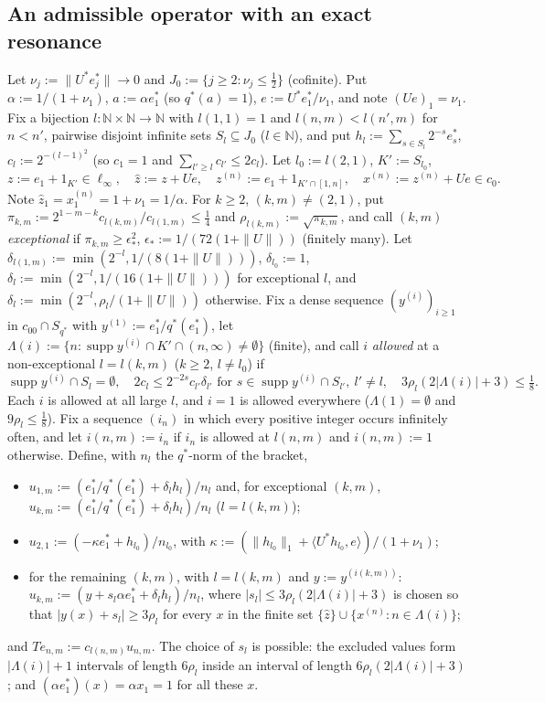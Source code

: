 \documentclass[10pt]{amsart}
\theoremstyle{definition}
\theoremstyle{remark}
\newcommand{\supp}{\operatorname{supp}}
\newcommand{\N}{\mathbb N}
\newcommand{\zh}{\hat z}
\newcommand{\ip}[2]{\langle #1,#2\rangle}
\begin{document}
\subsection{An admissible operator with an exact resonance}
Let $\nu_j:=\|U^*e_j^*\|\to0$ and $J_0:=\{j\ge2:\nu_j\le\frac12\}$
(cofinite).  Put $\alpha:=1/(1+\nu_1)$, $a:=\alpha e_1^*$ (so $q^*(a)=1$),
$e:=U^*e_1^*/\nu_1$, and note $(Ue)_1=\nu_1$.  Fix a bijection
$l:\N\times\N\to\N$ with $l(1,1)=1$ and $l(n,m)<l(n',m)$ for $n<n'$, pairwise
disjoint infinite sets $S_l\subseteq J_0$ ($l\in\N$), and put
$h_l:=\sum_{s\in S_l}2^{-s}e_s^*$, $c_l:=2^{-(l-1)^2}$ (so $c_1=1$ and
$\sum_{l'\ge l}c_{l'}\le2c_l$).  Let $l_0:=l(2,1)$, $K':=S_{l_0}$,
\[
 z:=e_1+1_{K'}\in\ell_\infty,\quad \zh:=z+Ue,\quad
 z^{(n)}:=e_1+1_{K'\cap[1,n]},\quad x^{(n)}:=z^{(n)}+Ue\in c_0 .
\]
Note $\zh_1=x^{(n)}_1=1+\nu_1=1/\alpha$.  For $k\ge2$, $(k,m)\ne(2,1)$, put
$\pi_{k,m}:=2^{1-m-k}c_{l(k,m)}/c_{l(1,m)}\le\frac14$ and
$\rho_{l(k,m)}:=\sqrt{\pi_{k,m}}$, and call $(k,m)$ \emph{exceptional} if
$\pi_{k,m}\ge\epsilon_*^2$, $\epsilon_*:=1/(72(1+\|U\|))$ (finitely many).
Let $\delta_{l(1,m)}:=\min(2^{-l},1/(8(1+\|U\|)))$, $\delta_{l_0}:=1$,
$\delta_l:=\min(2^{-l},1/(16(1+\|U\|)))$ for exceptional $l$, and
$\delta_l:=\min(2^{-l},\rho_l/(1+\|U\|))$ otherwise.  Fix a dense sequence
$(y^{(i)})_{i\ge1}$ in $c_{00}\cap S_{q^*}$ with $y^{(1)}:=e_1^*/q^*(e_1^*)$,
let $\Lambda(i):=\{n:\supp y^{(i)}\cap K'\cap(n,\infty)\ne\emptyset\}$
(finite), and call $i$ \emph{allowed} at a non-exceptional
$l=l(k,m)$ ($k\ge2$, $l\ne l_0$) if
\[
 \supp y^{(i)}\cap S_l=\emptyset,\quad 2c_l\le2^{-2s}c_{l'}\delta_{l'}
 \text{ for } s\in\supp y^{(i)}\cap S_{l'},\ l'\ne l,\quad
 3\rho_l(2|\Lambda(i)|+3)\le\tfrac18 .
\]
Each $i$ is allowed at all large $l$, and $i=1$ is allowed everywhere
($\Lambda(1)=\emptyset$ and $9\rho_l\le\frac18$).  Fix a sequence $(i_n)$ in
which every positive integer occurs infinitely often, and let
$i(n,m):=i_n$ if $i_n$ is allowed at $l(n,m)$ and $i(n,m):=1$ otherwise.
Define, with $n_l$ the $q^*$-norm of the bracket,
\begin{itemize}
\item $u_{1,m}:=(e_1^*/q^*(e_1^*)+\delta_lh_l)/n_l$ and, for exceptional
$(k,m)$, $u_{k,m}:=(e_1^*/q^*(e_1^*)+\delta_lh_l)/n_l$ ($l=l(k,m)$);
\item $u_{2,1}:=(-\kappa e_1^*+h_{l_0})/n_{l_0}$, with
$\kappa:=(\|h_{l_0}\|_1+\ip{U^*h_{l_0}}{e})/(1+\nu_1)$;
\item for the remaining $(k,m)$, with $l=l(k,m)$ and $y:=y^{(i(k,m))}$:
$u_{k,m}:=(y+s_l\alpha e_1^*+\delta_lh_l)/n_l$, where
$|s_l|\le3\rho_l(2|\Lambda(i)|+3)$ is chosen so that $|y(x)+s_l|\ge3\rho_l$
for every $x$ in the finite set $\{\zh\}\cup\{x^{(n)}:n\in\Lambda(i)\}$;
\end{itemize}
and $Te_{n,m}:=c_{l(n,m)}u_{n,m}$.  The choice of $s_l$ is possible: the
excluded values form $|\Lambda(i)|+1$ intervals of length $6\rho_l$ inside an
interval of length $6\rho_l(2|\Lambda(i)|+3)$; and $(\alpha
e_1^*)(x)=\alpha x_1=1$ for all these $x$.
\end{document}
